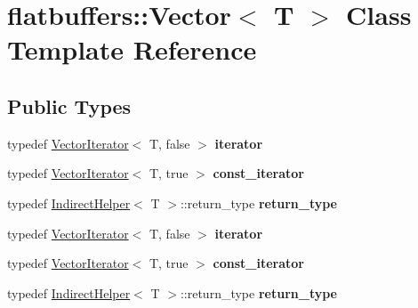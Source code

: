 \hypertarget{classflatbuffers_1_1Vector}{}\section{flatbuffers\+:\+:Vector$<$ T $>$ Class Template Reference}
\label{classflatbuffers_1_1Vector}
\subsection*{Public Types}
\begin{DoxyCompactItemize}
\item 
\mbox{\label{classflatbuffers_1_1Vector_af0a94a7aa84d74ea4d01acc8b333b095}} 
typedef \hyperlink{structflatbuffers_1_1VectorIterator}{Vector\+Iterator}$<$ T, false $>$ {\bfseries iterator}
\item 
\mbox{\label{classflatbuffers_1_1Vector_a9d6ef8a19053e7be3b006328b4d180db}} 
typedef \hyperlink{structflatbuffers_1_1VectorIterator}{Vector\+Iterator}$<$ T, true $>$ {\bfseries const\+\_\+iterator}
\item 
\mbox{\label{classflatbuffers_1_1Vector_a28dab085738663f5c866cf6570bb6289}} 
typedef \hyperlink{structflatbuffers_1_1IndirectHelper}{Indirect\+Helper}$<$ T $>$\+::return\+\_\+type {\bfseries return\+\_\+type}
\item 
\mbox{\label{classflatbuffers_1_1Vector_af0a94a7aa84d74ea4d01acc8b333b095}} 
typedef \hyperlink{structflatbuffers_1_1VectorIterator}{Vector\+Iterator}$<$ T, false $>$ {\bfseries iterator}
\item 
\mbox{\label{classflatbuffers_1_1Vector_a9d6ef8a19053e7be3b006328b4d180db}} 
typedef \hyperlink{structflatbuffers_1_1VectorIterator}{Vector\+Iterator}$<$ T, true $>$ {\bfseries const\+\_\+iterator}
\item 
\mbox{\label{classflatbuffers_1_1Vector_a28dab085738663f5c866cf6570bb6289}} 
typedef \hyperlink{structflatbuffers_1_1IndirectHelper}{Indirect\+Helper}$<$ T $>$\+::return\+\_\+type {\bfseries return\+\_\+type}
\end{DoxyCompactItemize}
